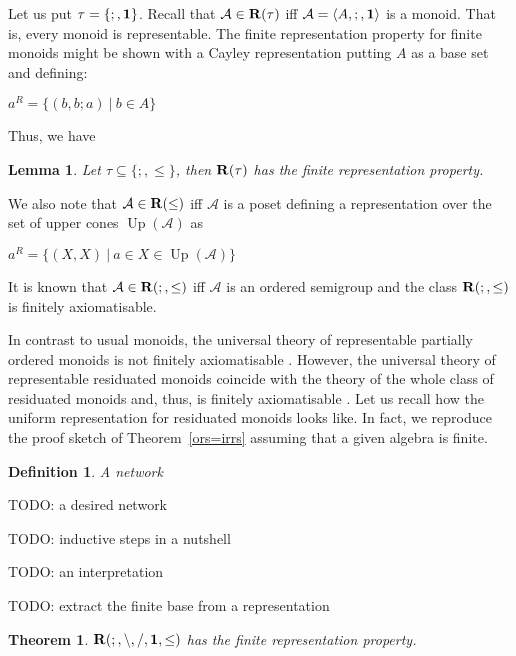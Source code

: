 \documentclass[a4paper]{article}
\theoremstyle{defin}
\newtheorem{defin}{Definition}
\theoremstyle{theorem}
\newtheorem{theorem}{Theorem}
\theoremstyle{prop}
\theoremstyle{lemma}
\newtheorem{lemma}{Lemma}
\theoremstyle{ex}
\theoremstyle{col}
\theoremstyle{claim}
\begin{document}
Let us put $\tau = \{ ;, {\bf 1} \}$. Recall that $\mathcal{A} \in {\bf R}(\tau)$ iff $\mathcal{A} = \langle A, ;, {\bf 1} \rangle$ is a monoid. That is, every monoid is representable. The finite representation property for finite monoids might be shown with a Cayley representation putting $A$ as a base set and defining:
\begin{center}
  $a^R = \{ (b, b ; a) \: | \: b \in A \}$
\end{center}
Thus, we have
\begin{lemma}
  Let $\tau \subseteq \{ ;, \leq \}$, then ${\bf R}(\tau)$ has the finite representation property.
\end{lemma}

We also note that $\mathcal{A} \in {\bf R}(\leq)$ iff $\mathcal{A}$ is a poset defining a representation over the set of upper cones
$\operatorname{Up}(\mathcal{A})$ as
\begin{center}
  $a^R = \{ (X,X) \: | \: a \in X \in \operatorname{Up}(\mathcal{A}) \}$
\end{center}

It is known that $\mathcal{A} \in {\bf R}(;, \leq)$ iff $\mathcal{A}$ is an ordered semigroup \cite{zaretskii1959representation} and the class ${\bf R}(;, \leq)$ is finitely axiomatisable.

In contrast to usual monoids, the universal theory of representable partially ordered monoids is not finitely axiomatisable \cite{hirsch2005class}. However, the universal theory of representable residuated monoids coincide with the theory of the whole class of residuated monoids and, thus, is finitely axiomatisable \cite{andreka1994lambek}. Let us recall how the uniform representation for residuated monoids looks like. In fact, we reproduce the proof sketch of Theorem~\ref{ors=irrs} assuming that a given algebra is finite.

\begin{defin}
  A network
\end{defin}

TODO: a desired network

TODO: inductive steps in a nutshell

TODO: an interpretation

TODO: extract the finite base from a representation


\begin{theorem}
  ${\bf R}(;, \setminus, /, {\bf 1}, \leq)$ has the finite representation property.
\end{theorem}
\end{document}
